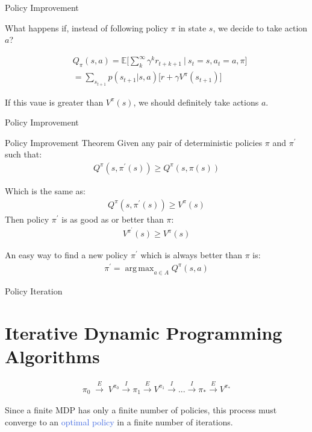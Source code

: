 \documentclass{beamer}
\DeclareMathOperator*{\argmax}{arg\,max}
\begin{document}
\begin{frame}{Policy Improvement}

What happens if, instead of following policy $\pi$ in state $s$, we decide to take action $a$?

\begin{align*}
    &Q_{\pi}(s,a) = \mathds{E} \bigg[\sum_{k}^{\infty}\gamma^{k} r_{t+k+1} \: \bigg| \: s_t=s, a_t=a,\pi \bigg] \\
		   & =  \sum_{s_{t+1}} p(s_{t+1}|s,a)\big[r + \gamma V^{\pi}(s_{t+1}) \big]
\end{align*}

If this vaue is greater than $V^{\pi}(s)$, we should definitely take actions $a$.

\end{frame}

\begin{frame}{Policy Improvement}


\begin{block}{Policy Improvement Theorem}
Given any pair of deterministic policies $\pi$ and $\pi^{\prime}$ such that:
\begin{align*}
Q^{\pi}(s, \pi^{\prime}(s)) \geq Q^{\pi}(s, \pi(s))
\end{align*}

Which is the same as:
\begin{align*}
Q^{\pi}(s, \pi^{\prime}(s)) \geq V^{\pi}(s)
\end{align*}
Then policy $\pi^{\prime}$ is as good as or better than $\pi$:
\begin{align*}
    V^{\pi^{\prime}}(s) \geq V^{\pi}(s)
\end{align*}
\end{block}

\hspace{1mm}

An easy way to find a new policy $\pi^{\prime}$ which is always better than $\pi$ is:
\begin{align*}
    \pi^{\prime} = \argmax_{a \in A} Q^{\pi}(s,a)
\end{align*}

\end{frame}

\begin{frame}{Policy Iteration}
\section{Iterative Dynamic Programming Algorithms}

\begin{align*}
\pi_0 \; \overset{E}{\longrightarrow} \; V^{\pi_0} \overset{I}\longrightarrow \pi_1 \overset{E}\longrightarrow V^{\pi_1} \overset{I}\longrightarrow . . . \overset{I}\longrightarrow \pi_{*} \overset{E}\longrightarrow V^{\pi_*}
\end{align*}

Since a finite MDP has only a finite number of policies, this process must converge to an \textcolor{RoyalBlue}{optimal policy} in a finite number of iterations.

\end{frame}
\end{document}
